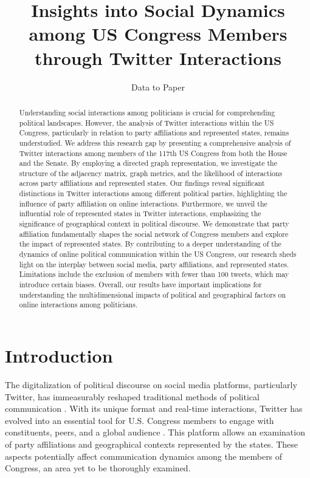 \documentclass[11pt]{article}
\title{Insights into Social Dynamics among US Congress Members through Twitter Interactions}
\author{Data to Paper}
\begin{document}
\maketitle
\begin{abstract}
Understanding social interactions among politicians is crucial for comprehending political landscapes. However, the analysis of Twitter interactions within the US Congress, particularly in relation to party affiliations and represented states, remains understudied. We address this research gap by presenting a comprehensive analysis of Twitter interactions among members of the 117th US Congress from both the House and the Senate. By employing a directed graph representation, we investigate the structure of the adjacency matrix, graph metrics, and the likelihood of interactions across party affiliations and represented states. Our findings reveal significant distinctions in Twitter interactions among different political parties, highlighting the influence of party affiliation on online interactions. Furthermore, we unveil the influential role of represented states in Twitter interactions, emphasizing the significance of geographical context in political discourse. We demonstrate that party affiliation fundamentally shapes the social network of Congress members and explore the impact of represented states. By contributing to a deeper understanding of the dynamics of online political communication within the US Congress, our research sheds light on the interplay between social media, party affiliations, and represented states. Limitations include the exclusion of members with fewer than 100 tweets, which may introduce certain biases. Overall, our results have important implications for understanding the multidimensional impacts of political and geographical factors on online interactions among politicians.
\end{abstract}
\section*{Introduction}

The digitalization of political discourse on social media platforms, particularly Twitter, has immeasurably reshaped traditional methods of political communication \cite{Muragod2018TheSM}. With its unique format and real-time interactions, Twitter has evolved into an essential tool for U.S. Congress members to engage with constituents, peers, and a global audience \cite{Eady2019HowMP}. This platform allows an examination of party affiliations and geographical contexts represented by the states. These aspects potentially affect communication dynamics among the members of Congress, an area yet to be thoroughly examined.
\end{document}
